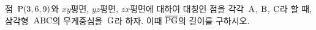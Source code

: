 점~$\mathrm{P}(3{,}\mkern3mu\mathopen{}6{,}\mkern3mu\mathopen{}9)$와 $xy$평면, $yz$평면, $zx$평면에 대하여 대칭인 점을 각각~$\mathrm{A}$, $\mathrm{B}$, $\mathrm{C}$라 할 때, 삼각형~$\mathrm{ABC}$의 무게중심을~$\mathrm{G}$라 하자. 이때 $\overline{\mathrm{PG}}$의 길이를 구하시오.
